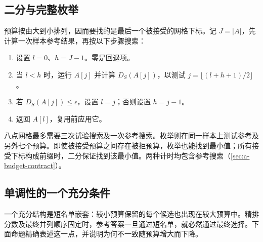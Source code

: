 \subsection{二分与完整枚举}

预算按由大到小排列，因而要找的是最后一个被接受的网格下标。记 $J=|A|$，先计算一次样本参考结果，再按以下步骤搜索：
\par\noindent\begin{minipage}{\linewidth}
\begin{enumerate}[leftmargin=*,itemsep=0.15em]
\item 设置 $l=0$、$h=J-1$。零是回退项。
\item 当 $l<h$ 时，运行 $A[j]$ 并计算 $D_S(A[j])$，以测试 $j=\lfloor(l+h+1)/2\rfloor$。
\item 若 $D_S(A[j])\leq\epsilon$，设置 $l=j$；否则设置 $h=j-1$。
\item 返回 $A[l]$，复用前应用它。
\end{enumerate}
\end{minipage}\par\medskip
八点网格最多需要三次试验搜索及一次参考搜索。枚举则在同一样本上测试参考及另外七个预算。即使被接受预算之间存在被拒预算，枚举也能找到最小值；所有接受下标构成前缀时，二分保证找到该最小值。两种计时均包含参考搜索（\cref{sec:a-budget-contract}）。

\subsection{单调性的一个充分条件}

一个充分结构是短名单嵌套：较小预算保留的每个候选也出现在较大预算中。精排分数及最终并列顺序固定时，参考答案一旦通过短名单，就必然通过最终选择。下面命题精确表述这一点，并说明为何不一致随预算增大而下降。

